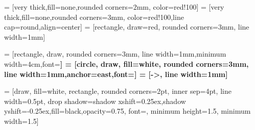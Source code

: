  = [very thick,fill=none,rounded corners=2mm, color=red!100]
 = [very thick,fill=none,rounded corners=3mm, color=red!100,line cap=round,align=center]
 = [rectangle, draw=red, rounded corners=3mm, line width=1mm]

 = [rectangle, draw, rounded corners=3mm, line width=1mm,minimum width=4cm,font=\bf]
 = [circle, draw, fill=white, rounded corners=3mm, line width=1mm,anchor=east,font=\bf]
 = [->, line width=1mm]

 = [draw, fill=white, rectangle, rounded corners=2pt, inner sep=4pt, line width=0.5pt, drop shadow={shadow xshift=0.25ex,shadow yshift=-0.25ex,fill=black,opacity=0.75}, font=\scriptsize\sffamily, minimum height=1.5\baselineskip, minimum width=1.5\baselineskip]